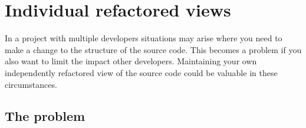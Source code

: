 
\chapter{Individual refactored views}

In a project with multiple developers situations may arise where you need to make a change to the structure of the source code. This becomes a problem if you also want to limit the impact other developers.  Maintaining your own independently refactored view of the source code could be valuable in these circumstances. 

\section{The problem}
